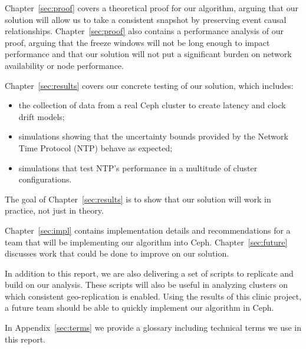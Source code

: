 Chapter~\ref{sec:proof} covers a theoretical proof for our algorithm,
arguing that our solution will allow us to take a consistent snapshot
by preserving event causal relationships. Chapter~\ref{sec:proof} also
contains a performance analysis of our proof, arguing that the freeze
windows will not be long enough to impact performance and that our
solution will not put a significant burden on network availability or
node performance.

Chapter~\ref{sec:results} covers our concrete testing of our solution,
which includes:

\begin{itemize}
\item the collection of data from a real Ceph cluster to create
  latency and clock drift models;
\item simulations showing that the uncertainty bounds provided by the
  Network Time Protocol (NTP) behave as expected;
\item simulations that test NTP's performance in a multitude of
  cluster configurations.
\end{itemize}
The goal of Chapter~\ref{sec:results} is to show that our solution will work
in practice, not just in theory.

Chapter~\ref{sec:impl} contains implementation details and
recommendations for a team that will be implementing our algorithm
into Ceph. Chapter~\ref{sec:future} discusses work that could be done
to improve on our solution.

In addition to this report, we are also delivering a set of scripts to
replicate and build on our analysis. These scripts will also be useful
in analyzing clusters on which consistent geo-replication is
enabled. Using the results of this clinic project, a future team
should be able to quickly implement our algorithm in Ceph.

In Appendix~\ref{sec:terms} we provide
a glossary including technical terms we use in this report.


